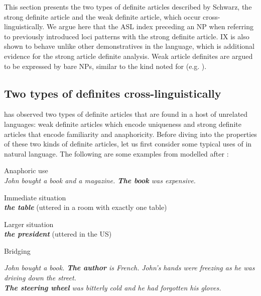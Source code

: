 \documentclass[output=paper,
modfonts
]{langscibook}
\begin{document}
This section presents the two types of definite articles described by Schwarz, the strong definite article and the weak definite article, which occur cross\hyp{}linguistically. We argue here that the ASL index preceding an NP when referring to previously introduced loci patterns with the strong definite article. IX is also shown to behave unlike other demonstratives in the language, which is additional evidence for the strong article definite analysis. Weak article definites are argued to be expressed by bare NPs, similar to the kind noted for  (e.g. \citealt{Jenks2015}).

\subsection{Two types of definites cross-linguistically}

\citet{Schwarz2009,Schwarz2013} has observed two types of definite articles that are found in a host of unrelated languages: weak definite articles which encode uniqueness and strong definite articles that encode familiarity and anaphoricity. Before diving into the properties of these two kinds of definite articles, let us first consider some typical uses of  in natural language. The following are some examples from \citet{Hawkins1978} modelled after \citet{Schwarz2009}:

\begin{exe}
\ex \label{ex:irani:7} Anaphoric use\\
\textit{John bought a book and a magazine. \textbf{The book} was expensive.} 

\ex \label{ex:irani:8} Immediate situation\\
\textit{\textbf{the table}} (uttered in a room with exactly one table)

\ex \label{ex:irani:9} Larger situation \\
\textit{\textbf{the president}} (uttered in the US) 

\ex \label{ex:irani:10} Bridging \citep{Clark1975}
\begin{xlist}
	\ex\label{ex:irani:10a} \textit{John bought a book. \textbf{The author} is French.}
	\ex\label{ex:irani:10b} \textit{John’s hands were freezing as he was driving down the street. \\ \textbf{The steering wheel} was bitterly cold and he had forgotten his gloves.}
\end{xlist}

\end{exe}
\end{document}
